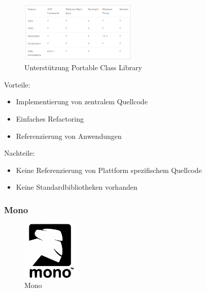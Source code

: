 \begin{figure}
	\begin{center}
		\includegraphics[width=0.5\textwidth]{images/technische_grundlagen/pclSupport.png}
	\end{center}
	\caption{Unterstützung Portable Class Library}
	\label{fig:pcl_support}
\end{figure}

\noindent
Vorteile:
\begin{itemize}
	\item Implementierung von zentralem Quellcode
	\item Einfaches Refactoring
	\item Referenzierung von Anwendungen
\end{itemize}
\noindent
Nachteile:
\begin{itemize}
	\item Keine Referenzierung von Plattform spezifischem Quellcode
	\item Keine Standardbibliotheken vorhanden
\end{itemize}

\newpage
\subsubsection{Mono}\label{mono}

\begin{figure}
	\begin{center}
		\includegraphics[width=0.25\textwidth]{images/technische_grundlagen/mono.png}
	\end{center}
	\caption{Mono}
	\label{fig:mono}
\end{figure}

